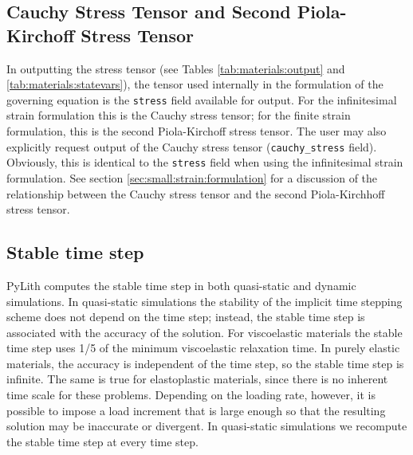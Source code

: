 \subsection{Cauchy Stress Tensor and Second Piola-Kirchoff Stress Tensor}

In outputting the stress tensor (see Tables
\vref{tab:materials:output} and \vref{tab:materials:statevars}),
the tensor used internally in the formulation of the governing
equation is the \texttt{stress} field available for output. For the
infinitesimal strain formulation this is the Cauchy stress tensor; for
the finite strain formulation, this is the second Piola-Kirchoff
stress tensor. The user may also explicitly request output of the
Cauchy stress tensor (\texttt{cauchy\_stress} field). Obviously, this
is identical to the \texttt{stress} field when using the infinitesimal
strain formulation.  See section \vref{sec:small:strain:formulation}
for a discussion of the relationship between the Cauchy stress tensor
and the second Piola-Kirchhoff stress tensor.


\subsection{Stable time step}
\label{sec:stable:time:step}

PyLith computes the stable time step in both quasi-static and dynamic
simulations. In quasi-static simulations the stability of the implicit
time stepping scheme does not depend on the time step; instead, the
stable time step is associated with the accuracy of the solution.  For
viscoelastic materials the stable time step uses 1/5 of the minimum
viscoelastic relaxation time. In purely elastic materials, the
accuracy is independent of the time step, so the stable time step is
infinite.  The same is true for elastoplastic materials, since there
is no inherent time scale for these problems. Depending on the loading
rate, however, it is possible to impose a load increment that is large
enough so that the resulting solution may be inaccurate or divergent.
In quasi-static simulations we recompute the stable time step at every
time step.


